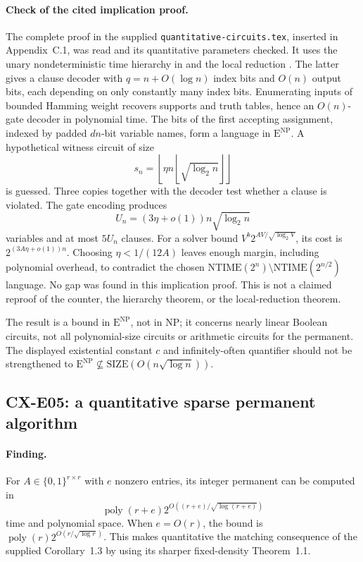 \documentclass[11pt,a4paper]{article}
\begin{document}
\paragraph{Check of the cited implication proof.}
The complete proof in the supplied
\nolinkurl{quantitative-circuits.tex}, inserted in Appendix~C.1, was
read and its quantitative parameters checked.
It uses the unary nondeterministic time hierarchy in
\cite[Theorem~2.1]{Williams2013} and the local reduction
\cite[Theorem~1]{JMV2013}.
The latter gives a clause decoder with
\(q=n+O(\log n)\) index bits and \(O(n)\) output bits, each depending
on only constantly many index bits.
Enumerating inputs of bounded Hamming weight recovers supports and
truth tables, hence an \(O(n)\)-gate decoder in polynomial time.
The bits of the first accepting assignment, indexed by padded
\(dn\)-bit variable names, form a language in
\(\mathrm E^{\mathrm{NP}}\).
A hypothetical witness circuit of size
\[
 s_n=\left\lfloor\eta n
          \left\lfloor\sqrt{\log_2 n}\right\rfloor\right\rfloor
\]
is guessed. Three copies together with the decoder test whether a
clause is violated.
The gate encoding produces
\[
 U_n=(3\eta+o(1))n\sqrt{\log_2 n}
\]
variables and at most \(5U_n\) clauses.
For a solver bound \(V^b2^{AV/\sqrt{\log_2 V}}\), its cost is
\(2^{(3A\eta+o(1))n}\).
Choosing \(\eta<1/(12A)\) leaves enough margin, including polynomial
overhead, to contradict the chosen
\(\mathrm{NTIME}(2^n)\setminus\mathrm{NTIME}(2^{n/2})\)
language.
No gap was found in this implication proof.
This is not a claimed reproof of the counter, the hierarchy theorem,
or the local-reduction theorem.

The result is a bound in \(\mathrm E^{\mathrm{NP}}\), not in NP;
it concerns nearly linear Boolean circuits, not all polynomial-size
circuits or arithmetic circuits for the permanent.
The displayed existential constant \(c\) and infinitely-often
quantifier should not be strengthened to
\(\mathrm E^{\mathrm{NP}}\not\subseteq
  \mathrm{SIZE}(O(n\sqrt{\log n}))\).

\subsection{CX-E05: a quantitative sparse permanent algorithm}
\label{finding:CX-E05}

\paragraph{Finding.}
For \(A\in\{0,1\}^{r\times r}\) with \(e\) nonzero entries, its
integer permanent can be computed in
\[
 \operatorname{poly}(r+e)
 2^{O((r+e)/\sqrt{\log(r+e)})}
\]
time and polynomial space.
When \(e=O(r)\), the bound is
\(\operatorname{poly}(r)2^{O(r/\sqrt{\log r})}\).
This makes quantitative the matching consequence of the supplied
Corollary~1.3 by using its sharper fixed-density Theorem~1.1.
\end{document}
